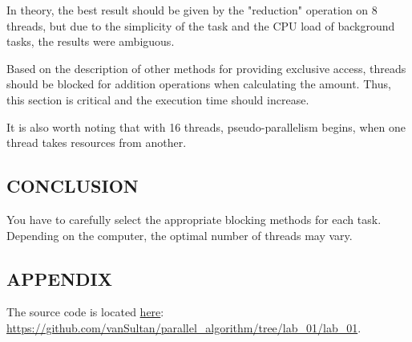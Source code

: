 In theory, the best result should be given by the "reduction" operation on 8 threads, but due to the simplicity of the task and the CPU load of background tasks, the results were ambiguous.

Based on the description of other methods for providing exclusive access, threads should be blocked for addition operations when calculating the amount. Thus, this section is critical and the execution time should increase.

It is also worth noting that with 16 threads, pseudo-parallelism begins, when one thread takes resources from another.

\subsection{CONCLUSION}\label{subsec:conclusion}

You have to carefully select the appropriate blocking methods for each task. Depending on the computer, the optimal number of threads may vary.

\subsection{APPENDIX}\label{subsec:appendix}

The source code is located \href{https://github.com/vanSultan/parallel_algorithm/tree/lab_01/lab_01}{here}: \url{https://github.com/vanSultan/parallel_algorithm/tree/lab_01/lab_01}.
